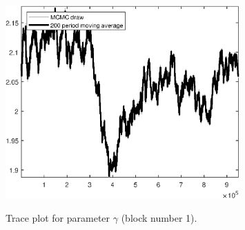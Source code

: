 \begin{figure}[H]
\centering
  \includegraphics[width=0.8\textwidth]{BRS_growth_util_sectoral/graphs/TracePlot_gam_blck_1}\\
    \caption{Trace plot for parameter ${\gamma}$ (block number 1).}
\end{figure}
